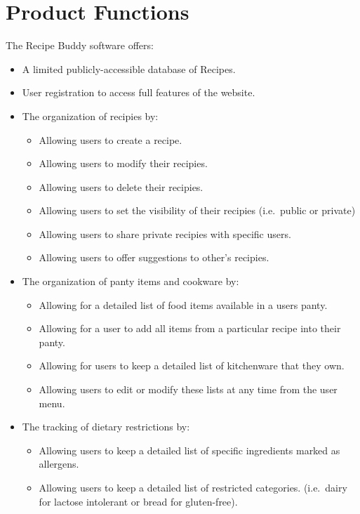 \documentclass{scrreprt}
\begin{document}
\section{Product Functions}
$ $The Recipe Buddy software offers:
\begin{itemize}
    \item A limited publicly-accessible database of Recipes.
    \item User registration to access full features of the website.
    \item The organization of recipies by:
          \begin{itemize}
              \item Allowing users to create a recipe.
              \item Allowing users to modify their recipies.
              \item Allowing users to delete their recipies.
              \item Allowing users to set the visibility of their recipies (i.e.\ public or private)
              \item Allowing users to share private recipies with specific users.
              \item Allowing users to offer suggestions to other's recipies.
          \end{itemize}
    \item The organization of panty items and cookware by:
          \begin{itemize}
              \item Allowing for a detailed list of food items available in a users panty.
              \item Allowing for a user to add all items from a particular recipe into their panty.
              \item Allowing for users to keep a detailed list of kitchenware that they own.
              \item Allowing users to edit or modify these lists at any time from the user menu.
          \end{itemize}
    \item The tracking of dietary restrictions by:
          \begin{itemize}
              \item Allowing users to keep a detailed list of specific ingredients marked as allergens.
              \item Allowing users to keep a detailed list of restricted categories. (i.e.\ dairy for lactose intolerant or bread for gluten-free).

\end{itemize}
\end{itemize}
\end{document}
